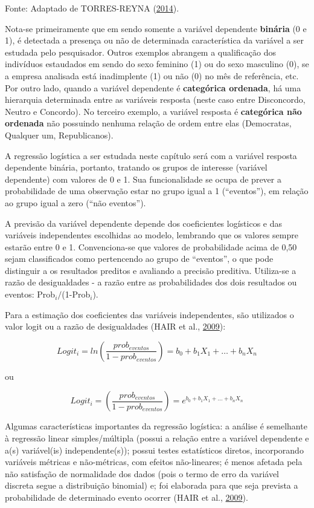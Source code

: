 \documentclass[12pt,brazil,oneside]{book}
\begin{document}
Fonte: Adaptado de TORRES-REYNA (\protect\hyperlink{ref-Torres-Reyna2014}{2014}).

Nota-se primeiramente que em sendo somente a variável dependente \textbf{binária} (0 e 1), é detectada a presença ou não de determinada característica da variável a ser estudada pelo pesquisador. Outros exemplos abrangem a qualificação dos indivíduos estaudados em sendo do sexo feminino (1) ou do sexo masculino (0), se a empresa analisada está inadimplente (1) ou não (0) no mês de referência, etc. Por outro lado, quando a variável dependente é \textbf{categórica ordenada}, há uma hierarquia determinada entre as variáveis resposta (neste caso entre Disconcordo, Neutro e Concordo). No terceiro exemplo, a variável resposta é \textbf{categórica não ordenada} não possuindo nenhuma relação de ordem entre elas (Democratas, Qualquer um, Republicanos).

A regressão logística a ser estudada neste capítulo será com a variável resposta dependente binária, portanto, tratando os grupos de interesse (variável dependente) com valores de 0 e 1. Sua funcionalidade se ocupa de prever a probabilidade de uma observação estar no grupo igual a 1 (``eventos''), em relação ao grupo igual a zero (``não eventos'').

A previsão da variável dependente depende dos coeficientes logísticos e das variáveis independentes escolhidas ao modelo, lembrando que os valores sempre estarão entre 0 e 1. Convenciona-se que valores de probabilidade acima de 0,50 sejam classificados como pertencendo ao grupo de ``eventos'', o que pode distinguir a os resultados preditos e avaliando a precisão preditiva. Utiliza-se a razão de desigualdades - a razão entre as probabilidades dos dois resultados ou eventos: Prob\(_{i}/\)(1-Prob\(_{i}\)).

Para a estimação dos coeficientes das variáveis independentes, são utilizados o valor logit ou a razão de desigualdades (HAIR et al., \protect\hyperlink{ref-Hair2009}{2009}):

\[
Logit_i=ln\left (\frac{prob_{eventos}}{1-prob_{eventos}}  \right )=b_0+b_1X_1+\ldots+b_nX_n
\]

ou

\[
Logit_i=\left (\frac{prob_{eventos}}{1-prob_{eventos}}  \right )=e^{b_0+b_1X_1+\ldots+b_nX_n}
\]

Algumas características importantes da regressão logística: a análise é semelhante à regressão linear simples/múltipla (possui a relação entre a variável dependente e a(s) variável(is) independente(s)); possui testes estatísticos diretos, incorporando variáveis métricas e não-métricas, com efeitos não-lineares; é menos afetada pela não satisfação de normalidade dos dados (pois o termo de erro da variável discreta segue a distribuição binomial) e; foi elaborada para que seja prevista a probabilidade de determinado evento ocorrer (HAIR et al., \protect\hyperlink{ref-Hair2009}{2009}).
\end{document}
